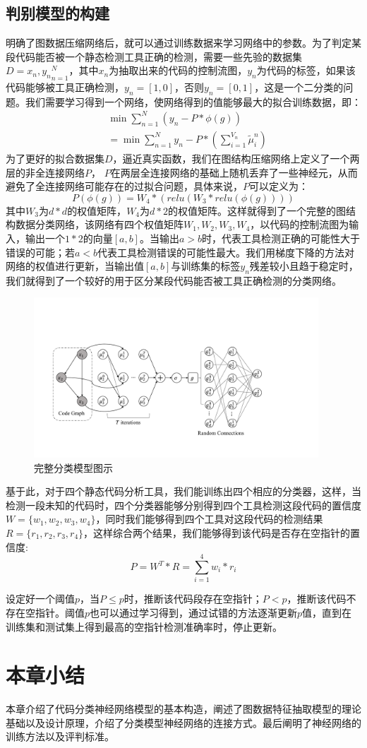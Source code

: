\subsection{判别模型的构建}
明确了图数据压缩网络后，就可以通过训练数据来学习网络中的参数。为了判定某段代码能否被一个静态检测工具正确的检测，需要一些先验的数据集 $D={x_n, y_n}_{n=1}^N$，其中$x_n$为抽取出来的代码的控制流图，$y_n$为代码的标签，如果该代码能够被工具正确检测，$y_n=[1, 0]$，否则$y_n=[0, 1]$，这是一个二分类的问题。我们需要学习得到一个网络，使网络得到的值能够最大的拟合训练数据，即：
\begin{align*}
&\min \sum_{n=1}^{N} (y_n - P*\phi(g))\\
&=\min \sum_{n=1}^{N} y_n - P*(\sum_{i=1}^{V_n} \tilde{\mu}_i^n)
\end{align*}
为了更好的拟合数据集$D$，逼近真实函数，我们在图结构压缩网络上定义了一个两层的非全连接网络$P$， $P$在两层全连接网络的基础上随机丢弃了一些神经元，从而避免了全连接网络可能存在的过拟合问题，具体来说，$P$可以定义为：
\begin{equation*}
P(\phi(g)) = W_4*(relu(W_3*relu(\phi(g))))
\end{equation*}
其中$W_3$为$d*d$的权值矩阵，$W_4$为$d*2$的权值矩阵。这样就得到了一个完整的图结构数据分类网络，该网络有四个权值矩阵$W_1, W_2, W_3, W_4$，以代码的控制流图为输入，输出一个$1*2$的向量$[a, b]$。当输出$a>b$时，代表工具检测正确的可能性大于错误的可能；若$a<b$代表工具检测错误的可能性最大。我们用梯度下降的方法对网络的权值进行更新，当输出值$[a, b]$与训练集的标签$y_n$残差较小且趋于稳定时，我们就得到了一个较好的用于区分某段代码能否被工具正确检测的分类网络。
\begin{figure}[htbp]
\begin{center}
\includegraphics[width=0.95\textwidth]{figures//6.pdf}
\caption{完整分类模型图示}
\label{default}
\end{center}
\end{figure}
\par 基于此，对于四个静态代码分析工具，我们能训练出四个相应的分类器，这样，当检测一段未知的代码时，四个分类器能够分别得到四个工具检测这段代码的置信度$W = \{w_1, w_2, w_3, w_4\}$，同时我们能够得到四个工具对这段代码的检测结果$R = \{r_1, r_2, r_3, r_4\}$，这样综合两个结果，我们能够得到该代码是否存在空指针的置信度:
$$P = W^T*R = \sum_{i=1}^4 w_i*r_i$$
\par 设定好一个阈值$p$，当$P\le p$时，推断该代码段存在空指针；$P<p$，推断该代码不存在空指针。阈值$p$也可以通过学习得到，通过试错的方法逐渐更新$p$值，直到在训练集和测试集上得到最高的空指针检测准确率时，停止更新。
\section{本章小结}
本章介绍了代码分类神经网络模型的基本构造，阐述了图数据特征抽取模型的理论基础以及设计原理，介绍了分类模型神经网络的连接方式。最后阐明了神经网络的训练方法以及评判标准。